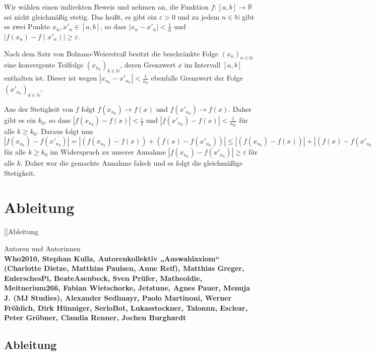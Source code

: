 \documentclass[fontsize=9pt,
               parskip=half-,
               DIV=14,
               listof=chapterentry,
               tocflat]{scrbook}
\newenvironment{authors}{\par\vspace*{\fill}\color{white}Autoren und
Autorinnen\\\bfseries}{\clearpage}
\begin{document}
\begin{proof*}
Wir wählen einen indirekten Beweis und nehmen an, die Funktion $f:[a,b]\to \mathbb {R} $ sei nicht gleichmäßig stetig. Das heißt, es gibt ein $\varepsilon >0$ und zu jedem $n\in \mathbb {N} $ gibt es zwei Punkte $x_{n},x'_{n}\in [a,b]$, so dass $|x_{n}-x'_{n}|<{\tfrac {1}{n}}$ und $|f(x_{n})-f(x'_{n})|\geq \varepsilon $.

Nach dem Satz von Bolzano-Weierstraß besitzt die beschränkte Folge $(x_{n})_{n\in \mathbb {N} }$ eine konvergente Teilfolge $(x_{n_{k}})_{k\in \mathbb {N} }$, deren Grenzwert $x$ im Intervall $[a,b]$ enthalten ist. Dieser ist wegen $|x_{n_{k}}-x'_{n_{k}}|<{\tfrac {1}{n_{k}}}$ ebenfalls Grenzwert der Folge $(x'_{n_{k}})_{k\in \mathbb {N} }$.

Aus der Stetigkeit von $f$ folgt $f(x_{n_{k}})\to f(x)$ und $f(x'_{n_{k}})\to f(x)$. Daher gibt es ein $k_{0}$, so dass $|f(x_{n_{k}})-f(x)|<{\tfrac {\varepsilon }{2}}$ und $|f(x'_{n_{k}})-f(x)|<{\tfrac {1}{n_{K}}}$ für alle $k\geq k_{0}$. Daraus folgt nun $|f(x_{n_{k}})-f(x'_{n_{k}})|=|(f(x_{n_{k}})-f(x))+(f(x)-f(x'_{n_{k}}))|\leq |(f(x_{n_{k}})-f(x))|+|(f(x)-f(x'_{n_{k}}))|<{\tfrac {\varepsilon }{2}}+{\tfrac {\varepsilon }{2}}=\varepsilon $ für alle $k\geq k_{0}$ im Widerspruch zu unserer Annahme $|f(x_{n_{k}})-f(x'_{n_{k}})|\geq \varepsilon $ für alle $k$. Daher war die gemachte Annahme falsch und es folgt die gleichmäßige Stetigkeit.

\end{proof*}

\part{Ableitung}

[]{Ableitung}\begin{authors}
Who2010, Stephan Kulla, Autorenkollektiv „Auswahlaxiom“ (Charlotte Dietze, Matthias Paulsen, Anne Reif), Matthias Greger, EulerschesPi, BeateAsenbeck, Sven Prüfer, Matheoldie, Meitnerium266, Fabian Wietschorke, Jetstune, Agnes Pauer, Menuja J. (MJ Studies), Alexander Sedlmayr, Paolo Martinoni, Werner Fröhlich, Dirk Hünniger, SerloBot, Lukasstockner, Talonnn, Esclear, Peter Gröbner, Claudia Renner, Jochen Burghardt\end{authors}

\chapter{Ableitung}
\end{document}
